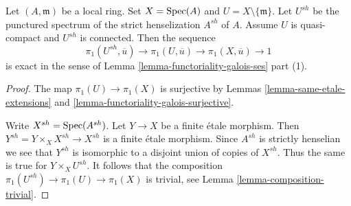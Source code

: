 \begin{lemma}
\label{lemma-local-exact-sequence}
Let $(A, \mathfrak m)$ be a local ring. Set $X = \mathop{\mathrm{Spec}}(A)$ and
$U = X \setminus \{\mathfrak m\}$. Let $U^{sh}$ be the punctured spectrum
of the strict henselization $A^{sh}$ of $A$.
Assume $U$ is quasi-compact and $U^{sh}$ is connected. Then the sequence
$$
\pi_1(U^{sh}, \overline{u}) \to \pi_1(U, \overline{u}) \to
\pi_1(X, \overline{u}) \to 1
$$
is exact in the sense of Lemma \ref{lemma-functoriality-galois-ses} part (1).
\end{lemma}

\begin{proof}
The map $\pi_1(U) \to \pi_1(X)$ is surjective by
Lemmas \ref{lemma-same-etale-extensions} and
\ref{lemma-functoriality-galois-surjective}.

\medskip\noindent
Write $X^{sh} = \mathop{\mathrm{Spec}}(A^{sh})$. Let $Y \to X$ be a finite \'etale morphism.
Then $Y^{sh} = Y \times_X X^{sh} \to X^{sh}$ is a finite \'etale morphism.
Since $A^{sh}$ is strictly henselian we see that $Y^{sh}$ is isomorphic
to a disjoint union of copies of $X^{sh}$. Thus the same is true for
$Y \times_X U^{sh}$. It follows that the composition
$\pi_1(U^{sh}) \to \pi_1(U) \to \pi_1(X)$ is trivial, see
Lemma \ref{lemma-composition-trivial}.


\end{proof}
